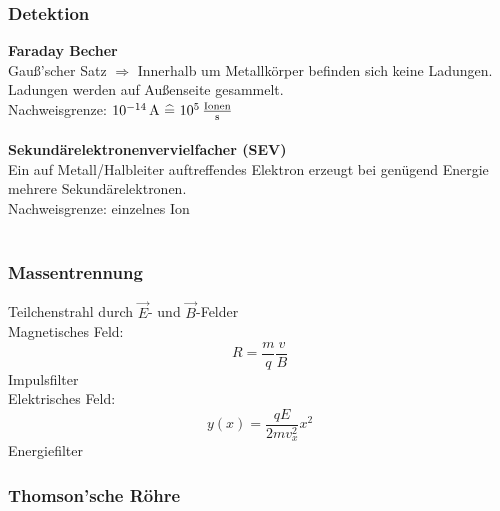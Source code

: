 \subsubsection{Detektion}

\textbf{Faraday Becher}\\[5pt]
Gauß'scher Satz $ \Rightarrow $ Innerhalb um Metallkörper befinden sich keine Ladungen. Ladungen werden auf Außenseite gesammelt.\\[5pt]
Nachweisgrenze: $ 10^{-14} \, \tx{A} \ \widehat{=} \ 10^{5} \, \frac{\tx{Ionen}}{\tx{s}} $\\
\\[5pt]
\textbf{Sekundärelektronenvervielfacher (SEV)}\\[5pt]
Ein auf Metall/Halbleiter auftreffendes Elektron erzeugt bei genügend Energie mehrere Sekundärelektronen.\\[5pt]
Nachweisgrenze: einzelnes Ion\\
\\

\subsubsection{Massentrennung}

Teilchenstrahl durch $ \vec{E} $- und $ \vec{B} $-Felder\\
Magnetisches Feld:
\begin{equation*}
R = \frac{m}{q} \frac{v}{B}
\end{equation*}
Impulsfilter\\[5pt]
Elektrisches Feld:
\begin{equation*}
y(x) = \frac{q E}{2 m v_x^2} x^2
\end{equation*}
Energiefilter\\[5pt]

\subsubsection{Thomson'sche Röhre}

